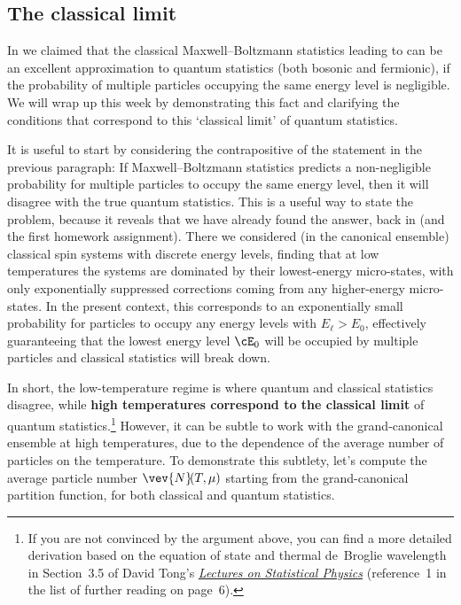 \subsection{\label{sec:quantum_classical}The classical limit}
In  we claimed that the classical Maxwell--Boltzmann statistics leading to  can be an excellent approximation to quantum statistics (both bosonic and fermionic), if the probability of multiple particles occupying the same energy level is negligible.
We will wrap up this week by demonstrating this fact and clarifying the conditions that correspond to this `classical limit' of quantum statistics.

It is useful to start by considering the contrapositive of the statement in the previous paragraph:
If Maxwell--Boltzmann statistics predicts a non-negligible probability for multiple particles to occupy the same energy level, then it will disagree with the true quantum statistics.
This is a useful way to state the problem, because it reveals that we have already found the answer, back in  (and the first homework assignment).
There we considered (in the canonical ensemble) classical spin systems with discrete energy levels, finding that at low temperatures the systems are dominated by their lowest-energy micro-states, with only exponentially suppressed corrections coming from any higher-energy micro-states.
In the present context, this corresponds to an exponentially small probability for particles to occupy any energy levels with $E_{\ell} > E_0$, effectively guaranteeing that the lowest energy level $\cE_0$ will be occupied by multiple particles and classical statistics will break down. %

In short, the low-temperature regime is where quantum and classical statistics disagree, while \textbf{high temperatures correspond to the classical limit} of quantum statistics.\footnote{If you are not convinced by the argument above, you can find a more detailed derivation based on the equation of state and thermal de~Broglie wavelength in Section~3.5 of David Tong's \href{https://www.damtp.cam.ac.uk/user/tong/statphys.html}{\textit{Lectures on Statistical Physics}} (reference~1 in the list of further reading on page~6).}
However, it can be subtle to work with the grand-canonical ensemble at high temperatures, due to the dependence of the average number of particles on the temperature.
To demonstrate this subtlety, let's compute the average particle number $\vev{N}\!(T, \mu)$ starting from the grand-canonical partition function, for both classical and quantum statistics.

